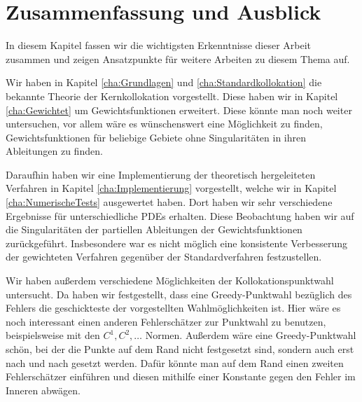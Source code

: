 \chapter{Zusammenfassung und Ausblick}
\label{cha:schluss}

In diesem Kapitel fassen wir die wichtigsten Erkenntnisse dieser Arbeit zusammen und zeigen Ansatzpunkte für weitere Arbeiten zu diesem Thema auf.

Wir haben in Kapitel \ref{cha:Grundlagen} und \ref{cha:Standardkollokation} die bekannte Theorie der Kernkollokation vorgestellt. Diese haben wir in Kapitel \ref{cha:Gewichtet} um Gewichtsfunktionen erweitert. Diese könnte man noch weiter untersuchen, vor allem wäre es wünschenswert eine Möglichkeit zu finden, Gewichtsfunktionen für beliebige Gebiete ohne Singularitäten in ihren Ableitungen zu finden.

Daraufhin haben wir eine Implementierung der theoretisch hergeleiteten Verfahren in Kapitel \ref{cha:Implementierung} vorgestellt, welche wir in Kapitel \ref{cha:NumerischeTests} ausgewertet haben. Dort haben wir sehr verschiedene Ergebnisse für unterschiedliche \acp{PDE} erhalten. Diese Beobachtung haben wir auf die Singularitäten der partiellen Ableitungen der Gewichtsfunktionen zurückgeführt. Insbesondere war es nicht möglich eine konsistente Verbesserung der gewichteten Verfahren gegenüber der Standardverfahren festzustellen.

Wir haben außerdem verschiedene Möglichkeiten der Kollokationspunktwahl untersucht. Da haben wir festgestellt, dass eine Greedy-Punktwahl bezüglich des Fehlers die geschickteste der vorgestellten Wahlmöglichkeiten ist. Hier wäre es noch interessant einen anderen Fehlerschätzer zur Punktwahl zu benutzen, beispielsweise mit den $C^1, C^2, \dots$ Normen. Außerdem wäre eine Greedy-Punktwahl schön, bei der die Punkte auf dem Rand nicht festgesetzt sind, sondern auch erst nach und nach gesetzt werden. Dafür könnte man auf dem Rand einen zweiten Fehlerschätzer einführen und diesen mithilfe einer Konstante gegen den Fehler im Inneren abwägen.